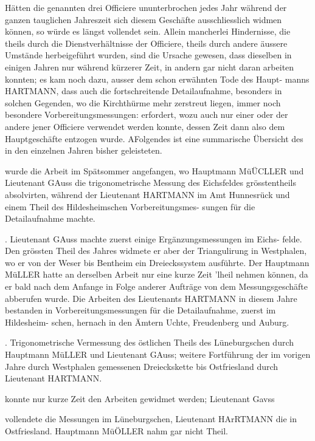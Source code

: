 \documentclass[12pt,a4paper]{article}
\theoremstyle{plain}
\theoremstyle{definition}
\theoremstyle{remark}
\begin{document}
\noindent
Hätten die genannten drei Officiere ununterbrochen jedes Jahr während
der ganzen tauglichen Jahreszeit sich diesem Geschäfte ausschliesslich widmen
können, so würde es längst vollendet sein. Allein mancherlei Hindernisse,
die theils durch die Dienstverhältnisse der Officiere, theils durch andere äussere
Umstände herbeigeführt wurden, sind die Ursache gewesen, dass dieselben in
einigen Jahren nur während kürzerer Zeit, in andern gar nicht daran arbeiten
konnten; es kam noch dazu, ausser dem schon erwähnten Tode des Haupt-
manns HARTMANN, dass auch die fortschreitende Detailaufnahme, besonders in
solchen Gegenden, wo die Kirchthürme mehr zerstreut liegen, immer noch
besondere Vorbereitungsmessungen: erfordert, wozu auch nur einer oder der
andere jener Officiere verwendet werden konnte, dessen Zeit dann also dem
Hauptgeschäfte entzogen wurde. AFolgendes ist eine summarische Übersicht
des in den einzelnen Jahren bisher geleisteten.

 wurde die Arbeit im Spätsommer angefangen, wo Hauptmann MüÜCLLER
und Lieutenant GAuss die trigonometrische Messung des Eichsfeldes
grösstentheils absolvirten, während der Lieutenant HARTMANN im Amt
Hunnesrück und einem Theil des Hildesheimschen Vorbereitungsmes-
sungen für die Detailaufnahme machte.

. Lieutenant GAuss machte zuerst einige Ergänzungsmessungen im Eichs-
felde. Den grössten Theil des Jahres widmete er aber der Triangulirung
in Westphalen, wo er von der Weser bis Bentheim ein Dreieckssystem
ausführte. Der Hauptmann MüLLER hatte an derselben Arbeit nur eine
kurze Zeit 'lheil nehmen können, da er bald nach dem Anfange in
Folge anderer Aufträge von dem Messungsgeschäfte abberufen wurde.
Die Arbeiten des Lieutenants HARTMANN in diesem Jahre bestanden in
Vorbereitungsmessungen für die Detailaufnahme, zuerst im Hildesheim-
schen, hernach in den Ämtern Uchte, Freudenberg und Auburg.

. Trigonometrische Vermessung des östlichen Theils des Lüneburgschen
durch Hauptmann MüLLER und Lieutenant GAuss; weitere Fortführung
der im vorigen Jahre durch Westphalen gemessenen Dreieckskette bis
Ostfriesland durch Lieutenant HARTMANN.

 konnte nur kurze Zeit den Arbeiten gewidmet werden; Lieutenant Gavss

\noindent

\noindent
vollendete die Messungen im Lüneburgschen, Lieutenant HArRTMANN die
in Ostfriesland. Hauptmann MüÖLLER nahm gar nicht Theil.
\end{document}
